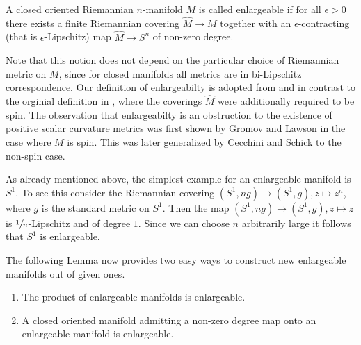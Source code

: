 \begin{definition}
    A closed oriented Riemannian $n$-manifold $M$ is called enlargeable if for all $\epsilon >0$ there exists a finite Riemannian covering $\hat{M} \to M$ together with an $\epsilon$-contracting (that is $\epsilon$-Lipschitz) map $\hat{M} \to S^n$ of non-zero degree.
\end{definition}

Note that this notion does not depend on the particular choice of Riemannian metric on $M$, since for closed manifolds all metrics are in bi-Lipschitz correspondence. Our definition of enlargeabilty is adopted from \cite{cecchini2021enlargeable} and \cite{HankeSchick} in contrast to the orginial definition in \cite{gromov1980spin}, where the coverings $\hat{M}$ were additionally required to be spin. The observation that enlargeabilty is an obstruction to the existence of positive scalar curvature metrics was first shown by Gromov and Lawson \cite{gromov1980spin} in the case where $M$ is spin. This was later generalized by Cecchini and Schick \cite{cecchini2021enlargeable} to the non-spin case.

As already mentioned above, the simplest example for an enlargeable manifold is $S^1$. To see this consider the Riemannian covering $(S^1,n g) \to (S^1, g), z \mapsto z^n$, where $g$ is the standard metric on $S^1$. Then the map $(S^1,n g) \to (S^1, g), z \mapsto z$ is $\sfrac{1}{n}$-Lipschitz and of degree $1$. Since we can choose $n$ arbitrarily large it follows that $S^1$ is enlargeable. 

The following Lemma now provides two easy ways to construct new enlargeable manifolds out of given ones. 

\begin{lemma}
    \label{lem:constructing_enlargeable_mnf}
    \begin{enumerate}[label=(\roman*)]
        \item The product of enlargeable manifolds is enlargeable. \label{eq:lem_for_constructing_enlargeable_mnf_1}
        \item A closed oriented manifold admitting a non-zero degree map onto an enlargeable manifold is enlargeable. \label{eq:lem_for_constructing_enlargeable_mnf_2}
    \end{enumerate}
\end{lemma}

